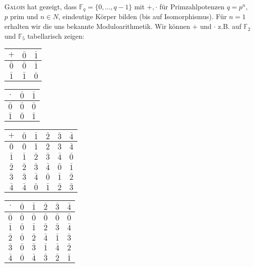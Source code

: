 \begin{example} \textsc{Galois} hat gezeigt, dass $\mathbb{F}_q = \{0,...,q-1\}$ mit $+, \cdot$ für Primzahlpotenzen $q = p^n$, $p$ prim und $n\in N$, eindeutige Körper bilden (bis auf Isomorphismus).
Für $n = 1$ erhalten wir die uns bekannte Moduloarithmetik. Wir können $+$ und $\cdot$ z.B. auf $\mathbb{F}_2$ und $\mathbb{F}_5$ tabellarisch zeigen:

\begin{table}[!htbp]
    \centering
    \begin{tabular}{c|c c}
        $+$       & $\bar{0}$ & $\bar{1}$\\
        \hline
        $\bar{0}$ & $\bar{0}$ & $\bar{1}$ \\
        $\bar{1}$ & $\bar{1}$ & $\bar{0}$
    \end{tabular}
    \qquad
    \begin{tabular}{c|c c}
        $\cdot$       & $\bar{0}$ & $\bar{1}$\\
        \hline
        $\bar{0}$ & $\bar{0}$ & $\bar{0}$ \\
        $\bar{1}$ & $\bar{0}$ & $\bar{1}$
    \end{tabular}
\end{table}
\begin{table}[!htbp]
    \centering
    \begin{tabular}{c|c c c c c}
        $+$       & $\bar{0}$ & $\bar{1}$& $\bar{2}$ & $\bar{3}$ & $\bar{4}$\\
        \hline
        $\bar{0}$ & $\bar{0}$ & $\bar{1}$& $\bar{2}$ & $\bar{3}$ & $\bar{4}$\\
        $\bar{1}$ & $\bar{1}$& $\bar{2}$ & $\bar{3}$ & $\bar{4}$ & $\bar{0}$\\
        $\bar{2}$& $\bar{2}$ & $\bar{3}$ & $\bar{4}$ & $\bar{0}$ & $\bar{1}$\\
        $\bar{3}$ & $\bar{3}$ & $\bar{4}$ & $\bar{0}$ & $\bar{1}$& $\bar{2}$\\
        $\bar{4}$  & $\bar{4}$ & $\bar{0}$ & $\bar{1}$& $\bar{2}$& $\bar{3}$\\
    \end{tabular}
    \qquad
    \begin{tabular}{c|c c c c c}
        $\cdot$       & $\bar{0}$ & $\bar{1}$& $\bar{2}$ & $\bar{3}$ & $\bar{4}$\\
        \hline
        $\bar{0}$ & $\bar{0}$ & $\bar{0}$& $\bar{0}$ & $\bar{0}$ & $\bar{0}$\\
        $\bar{1}$ & $\bar{0}$& $\bar{1}$ & $\bar{2}$ & $\bar{3}$ & $\bar{4}$\\
        $\bar{2}$& $\bar{0}$ & $\bar{2}$ & $\bar{4}$ & $\bar{1}$ & $\bar{3}$\\
        $\bar{3}$ & $\bar{0}$ & $\bar{3}$ & $\bar{1}$ & $\bar{4}$& $\bar{2}$\\
        $\bar{4}$  & $\bar{0}$ & $\bar{4}$ & $\bar{3}$& $\bar{2}$& $\bar{1}$\\
    \end{tabular}
\end{table}


\end{example}

